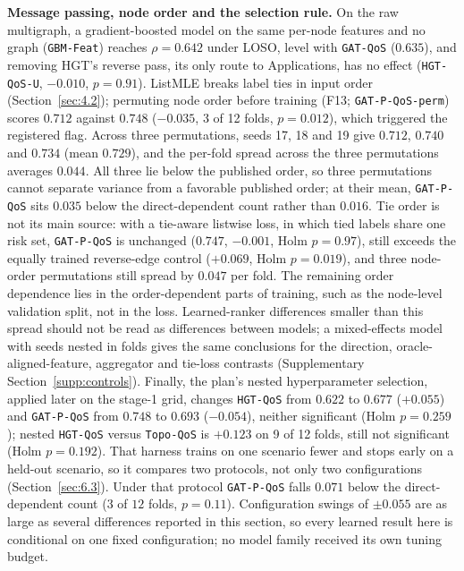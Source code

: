 \documentclass[preprint,3p]{elsarticle}
\begin{document}
\noindent\textbf{Message passing, node order and the selection rule.} On the raw multigraph, a gradient-boosted model on the same per-node features and no graph (\texttt{GBM-Feat}) reaches $\rho = 0.642$ under LOSO, level with \texttt{GAT-QoS} ($0.635$), and removing HGT's reverse pass, its only route to Applications, has no effect (\texttt{HGT-QoS-U}, $-0.010$, $p = 0.91$). ListMLE breaks label ties in input order (Section~\ref{sec:4.2}); permuting node order before training (F13; \texttt{GAT-P-QoS-perm}) scores $0.712$ against $0.748$ ($-0.035$, 3 of 12 folds, $p = 0.012$), which triggered the registered flag. Across three permutations, seeds 17, 18 and 19 give $0.712$, $0.740$ and $0.734$ (mean $0.729$), and the per-fold spread across the three permutations averages $0.044$. All three lie below the published order, so three permutations cannot separate variance from a favorable published order; at their mean, \texttt{GAT-P-QoS} sits $0.035$ below the direct-dependent count rather than $0.016$. Tie order is not its main source: with a tie-aware listwise loss, in which tied labels share one risk set, \texttt{GAT-P-QoS} is unchanged ($0.747$, $-0.001$, Holm $p = 0.97$), still exceeds the equally trained reverse-edge control ($+0.069$, Holm $p = 0.019$), and three node-order permutations still spread by $0.047$ per fold. The remaining order dependence lies in the order-dependent parts of training, such as the node-level validation split, not in the loss. Learned-ranker differences smaller than this spread should not be read as differences between models; a mixed-effects model with seeds nested in folds gives the same conclusions for the direction, oracle-aligned-feature, aggregator and tie-loss contrasts (Supplementary Section~\ref{supp:controls}). Finally, the plan's nested hyperparameter selection, applied later on the stage-1 grid, changes \texttt{HGT-QoS} from $0.622$ to $0.677$ ($+0.055$) and \texttt{GAT-P-QoS} from $0.748$ to $0.693$ ($-0.054$), neither significant (Holm $p = 0.259$); nested \texttt{HGT-QoS} versus \texttt{Topo-QoS} is $+0.123$ on 9 of 12 folds, still not significant (Holm $p = 0.192$). That harness trains on one scenario fewer and stops early on a held-out scenario, so it compares two protocols, not only two configurations (Section~\ref{sec:6.3}). Under that protocol \texttt{GAT-P-QoS} falls $0.071$ below the direct-dependent count ($3$ of $12$ folds, $p = 0.11$). Configuration swings of $\pm 0.055$ are as large as several differences reported in this section, so every learned result here is conditional on one fixed configuration; no model family received its own tuning budget.
\end{document}
